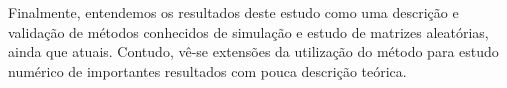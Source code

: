 \documentclass[12pt]{report}
\begin{document}
Finalmente, entendemos os resultados deste estudo como uma descrição e validação de métodos conhecidos de simulação e estudo de matrizes aleatórias, ainda que atuais. Contudo, vê-se extensões da utilização do método para estudo numérico de importantes resultados com pouca descrição teórica.






\end{document}
